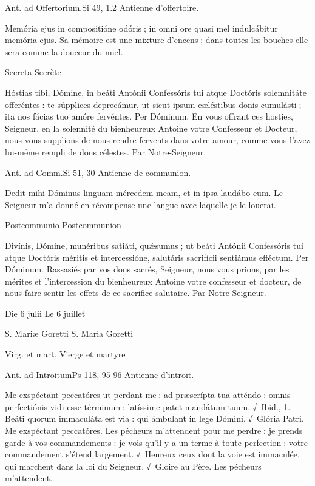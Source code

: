 \begin{paracol}{2}
Ant. ad Offertorium.\hfill Si 49, 1.2
\switchcolumn
Antienne d’offertoire.
\switchcolumn*

Memória ejus in compositióne odóris ; in omni ore quasi mel indulcábitur memória ejus.
\switchcolumn
Sa mémoire est une mixture d’encens ; dans toutes les bouches elle sera comme la douceur du miel.
\switchcolumn*

Secreta
\switchcolumn
Secrète
\switchcolumn*

Hóstias tibi, Dómine, in beáti  Antónii Confessóris tui atque Doctóris solemnitáte offeréntes : te súpplices deprecámur, ut sicut ipsum cæléstibus donis cumulásti ; ita nos fácias tuo amóre fervéntes. Per Dóminum.
\switchcolumn
En vous offrant ces hosties, Seigneur, en  la solennité du bienheureux Antoine votre Confesseur et Docteur, nous vous supplions de nous rendre fervents dans votre amour, comme vous l’avez lui-même rempli de dons célestes. Par Notre-Seigneur.
\switchcolumn*

Ant. ad Comm.\hfill Si 51, 30
\switchcolumn
Antienne de communion.
\switchcolumn*

Dedit mihi Dóminus linguam mércedem meam, et in ipsa laudábo eum.
\switchcolumn
Le Seigneur m’a donné en récompense une langue avec laquelle je le louerai.
\switchcolumn*

Postcommunio
\switchcolumn
Postcommunion
\switchcolumn*

Divínis, Dómine, munéribus satiáti,  quǽsumus ; ut beáti Antónii Confessóris tui atque Doctóris méritis et intercessióne, salutáris sacrifícii sentiámus efféctum. Per Dóminum.
\switchcolumn
Rassasiés par vos dons sacrés, Seigneur,  nous vous prions, par les mérites et l’intercession du bienheureux Antoine votre confesseur et docteur, de nous faire sentir les effets de ce sacrifice salutaire. Par Notre-Seigneur.
\switchcolumn*

Die 6 julii
\switchcolumn
Le 6 juillet
\switchcolumn*

S. Mariæ Goretti
\switchcolumn
S. Maria Goretti
\switchcolumn*

Virg. et mart.
\switchcolumn
Vierge et martyre
\switchcolumn*

Ant. ad Introitum\hfill Ps 118, 95-96
\switchcolumn
Antienne d’introït.
\switchcolumn*

Me exspéctant peccatóres ut  perdant me : ad præscrípta tua atténdo : omnis perfectiónis vidi esse términum : latíssime patet mandátum tuum. √~Ibid., 1. Beáti quorum immaculáta est via : qui ámbulant in lege Dómini. √~Glória Patri. Me exspéctant peccatóres.
\switchcolumn
Les pécheurs m’attendent pour me  perdre : je prends garde à vos commandements : je vois qu’il y a un terme à toute perfection : votre commandement s’étend largement. √~Heureux ceux dont la voie est immaculée, qui marchent dans la loi du Seigneur. √~Gloire au Père. Les pécheurs m’attendent.
\switchcolumn*


\end{paracol}
